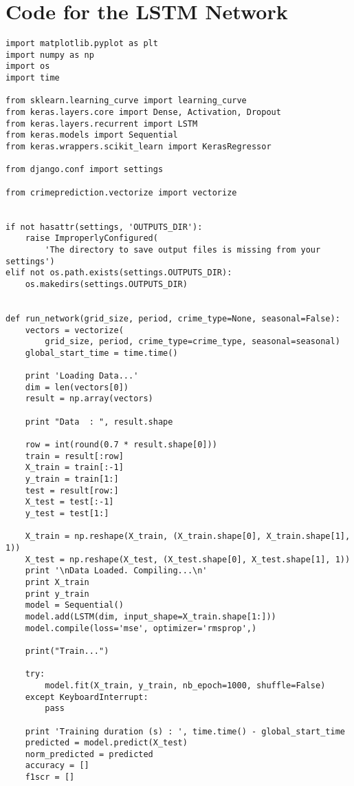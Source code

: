 \chapter{Code for the LSTM Network} \label{code-network}
\begin{small}
\begin{verbatim}
import matplotlib.pyplot as plt
import numpy as np
import os
import time

from sklearn.learning_curve import learning_curve
from keras.layers.core import Dense, Activation, Dropout
from keras.layers.recurrent import LSTM
from keras.models import Sequential
from keras.wrappers.scikit_learn import KerasRegressor

from django.conf import settings

from crimeprediction.vectorize import vectorize


if not hasattr(settings, 'OUTPUTS_DIR'):
    raise ImproperlyConfigured(
        'The directory to save output files is missing from your settings')
elif not os.path.exists(settings.OUTPUTS_DIR):
    os.makedirs(settings.OUTPUTS_DIR)


def run_network(grid_size, period, crime_type=None, seasonal=False):
    vectors = vectorize(
        grid_size, period, crime_type=crime_type, seasonal=seasonal)
    global_start_time = time.time()

    print 'Loading Data...'
    dim = len(vectors[0])
    result = np.array(vectors)

    print "Data  : ", result.shape

    row = int(round(0.7 * result.shape[0]))
    train = result[:row]
    X_train = train[:-1]
    y_train = train[1:]
    test = result[row:]
    X_test = test[:-1]
    y_test = test[1:]

    X_train = np.reshape(X_train, (X_train.shape[0], X_train.shape[1], 1))
    X_test = np.reshape(X_test, (X_test.shape[0], X_test.shape[1], 1))
    print '\nData Loaded. Compiling...\n'
    print X_train
    print y_train
    model = Sequential()
    model.add(LSTM(dim, input_shape=X_train.shape[1:]))
    model.compile(loss='mse', optimizer='rmsprop',)

    print("Train...")

    try:
        model.fit(X_train, y_train, nb_epoch=1000, shuffle=False)
    except KeyboardInterrupt:
        pass

    print 'Training duration (s) : ', time.time() - global_start_time
    predicted = model.predict(X_test)
    norm_predicted = predicted
    accuracy = []
    f1scr = []


\end{verbatim}
\end{small}
